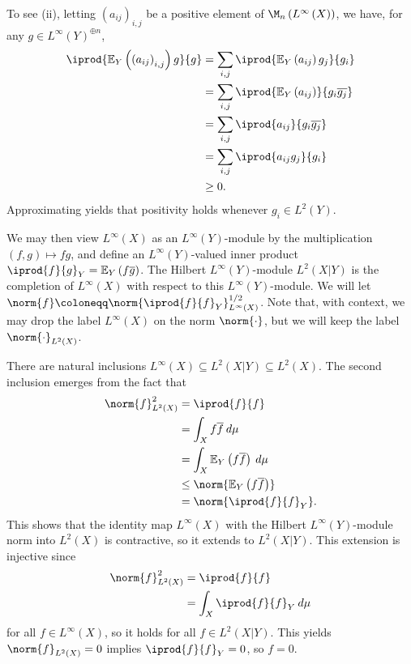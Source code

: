 \documentclass[10pt]{mypackage}
\renewcommand{\coloneq}{\coloneqq}
\begin{document}
To see (ii), letting $\left( a_{ij} \right)_{i,j}$ be a positive element of $\M_n\left( L^{\infty}\left( X \right) \right)$, we have, for any $g\in L^{\infty}\left( Y \right)^{\oplus n}$,
\begin{align*}
  \iprod{ \mathbb{E}_Y\left( \left( a_{ij} \right)_{i,j} \right)g }{g} &= \sum_{i,j} \iprod{ \mathbb{E}_Y\left( a_{ij} \right)g_j }{g_i}\\
                                                                       &= \sum_{i,j} \iprod{ \mathbb{E}_Y\left( a_{ij} \right) }{g_i \overline{g_j}}\\
                                                                       &= \sum_{i,j} \iprod{a_{ij}}{g_i \overline{g_j}}\\
                                                                       &= \sum_{i,j} \iprod{a_{ij}g_j}{g_i}\\
                                                                       &\geq 0.
\end{align*}
Approximating yields that positivity holds whenever $g_i\in L^2\left( Y \right)$.

We may then view $L^{\infty}\left( X \right)$ as an $L^{\infty}\left( Y \right)$-module by the multiplication $\left( f,g \right)\mapsto fg$, and define an $L^{\infty}\left( Y \right)$-valued inner product $ \iprod{f}{g}_Y = \mathbb{E}_Y\left( f \overline{g} \right) $. The Hilbert $L^{\infty}\left( Y \right)$-module $L^{2}\left( X|Y \right)$ is the completion of $L^{\infty}\left( X \right)$ with respect to this $L^{\infty}\left( Y \right)$-module. We will let $\norm{f} \coloneq \norm{ \iprod{f}{f}_Y }_{L^{\infty}\left( X \right)}^{1/2}$. Note that, with context, we may drop the label $L^{\infty}\left( X \right)$ on the norm $\norm{\cdot}$, but we will keep the label $ \norm{\cdot}_{L^2\left( X \right)} $.

There are natural inclusions $L^{\infty}\left( X \right) \subseteq L^{2}\left( X|Y \right) \subseteq L^{2}\left( X \right)$. The second inclusion emerges from the fact that
\begin{align*}
  \norm{f}_{L^2(X)}^2 &= \iprod{f}{f}\\
                      &= \int_{X}^{} f \overline{f}\:d\mu\\
                      &= \int_{X}^{} \mathbb{E}_Y\left( f \overline{f} \right)\:d\mu\\
                      &\leq \norm{ \mathbb{E}_Y\left( f \overline{f} \right) }\\
                      &= \norm{ \iprod{f}{f}_Y }.
\end{align*}
This shows that the identity map $L^{\infty}\left( X \right)$ with the Hilbert $L^{\infty}(Y)$-module norm into $L^{2}\left( X \right)$ is contractive, so it extends to $L^2\left( X|Y \right)$. This extension is injective since
\begin{align*}
  \norm{f}_{L^2(X)}^2 &= \iprod{f}{f}\\
                      &= \int_{X}^{} \iprod{f}{f}_Y\:d\mu
\end{align*}
for all $f\in L^{\infty}\left( X \right)$, so it holds for all $f\in L^2\left( X|Y \right)$. This yields $\norm{f}_{L^2(X)} = 0$ implies $ \iprod{f}{f}_Y = 0 $, so $f = 0$.
\end{document}

